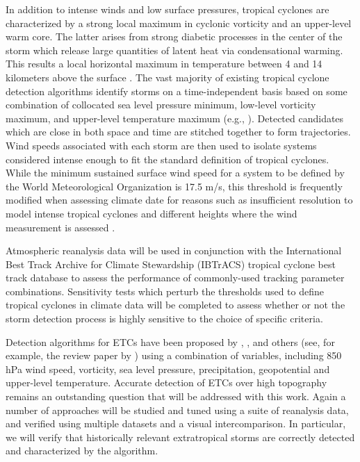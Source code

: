 \documentclass[11pt]{article}
\begin{document}
In addition to intense winds and low surface pressures, tropical cyclones are characterized by a strong local maximum in cyclonic vorticity and an upper-level warm core. The latter arises from strong diabetic processes in the center of the storm which release large quantities of latent heat via condensational warming. This results a local horizontal maximum in temperature between 4 and 14 kilometers above the surface \citep{SternNolan2011}. The vast majority of existing tropical cyclone detection algorithms identify storms on a time-independent basis based on some combination of collocated sea level pressure minimum, low-level vorticity maximum, and upper-level temperature maximum (e.g., \citet{Vitart1997,Oouchi2006,Bengtsson2007a,Knutson2007,Tory2013a,Zarzycki2014AMIPTCs}). Detected candidates which are close in both space and time are stitched together to form trajectories. Wind speeds associated with each storm are then used to isolate systems considered intense enough to fit the standard definition of tropical cyclones. While the minimum sustained surface wind speed for a system to be defined by the World Meteorological Organization is 17.5 m/s, this threshold is frequently modified when assessing climate date for reasons such as insufficient resolution to model intense tropical cyclones and different heights where the wind measurement is assessed \citep{Walsh2007}.

Atmospheric reanalysis data will be used in conjunction with the International Best Track Archive for Climate Stewardship (IBTrACS) tropical cyclone best track database \citep{Knapp2010} to assess the performance of commonly-used tracking parameter combinations. Sensitivity tests which perturb the thresholds used to define tropical cyclones in climate data will be completed to assess whether or not the storm detection process is highly sensitive to the choice of specific criteria.

Detection algorithms for ETCs have been proposed by \cite{wang2006climatology}, \cite{wernli2006surface}, \cite{raible2008northern} and others (see, for example, the review paper by \cite{ulbrich2009extra}) using a combination of variables, including 850 hPa wind speed, vorticity, sea level pressure, precipitation, geopotential and upper-level temperature.  Accurate detection of ETCs over high topography remains an outstanding question that will be addressed with this work.  Again a number of approaches will be studied and tuned using a suite of reanalysis data, and verified using multiple datasets and a visual intercomparison.  In particular, we will verify that historically relevant extratropical storms are correctly detected and characterized by the algorithm.
\end{document}
